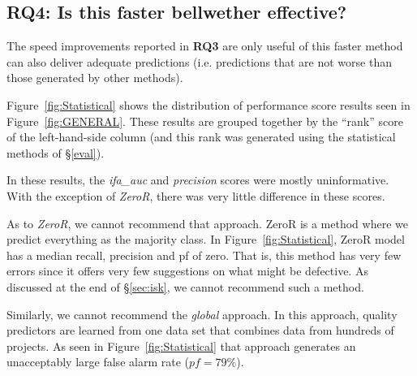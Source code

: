 \documentclass[10pt,journal,compsoc]{IEEEtran}
\newcommand{\fig}[1]{Figure~\ref{fig:#1}}
\begin{document}
 

\subsection*{RQ4: Is this faster bellwether effective?}
\label{sec:rq4}

The speed improvements reported in {\bf RQ3} are only useful
of this faster method can also deliver adequate predictions
(i.e. predictions that are not worse
than those generated by other methods).

 
Figure~\ref{fig:Statistical} shows the distribution of
performance score results seen in \fig{GENERAL}. These results are grouped together by the ``rank'' score
of the left-hand-side column 
(and this rank was generated using the statistical methods of
\S\ref{eval}).


In these results, the {\em ifa\_auc}  and {\em precision} scores
were mostly uninformative. With the exception of {\em ZeroR},
there was very little difference in these scores.




As to {\em ZeroR}, we cannot recommend that approach.
ZeroR is a method where we predict everything as the majority class.
In Figure~\ref{fig:Statistical}, ZeroR model has a median recall, precision and pf of zero. 
That is, this method has very few errors since it offers very few suggestions on what might be defective.
As discussed at the end of   \S\ref{sec:isk}, we cannot recommend such a method.
  

Similarly, we cannot recommend the    {\em global} approach.
In this approach, quality predictors are learned from   one data set that combines
data from hundreds of projects. As seen in Figure~\ref{fig:Statistical} 
that approach generates an unacceptably large false alarm rate ($pf=79\%$).
\end{document}

